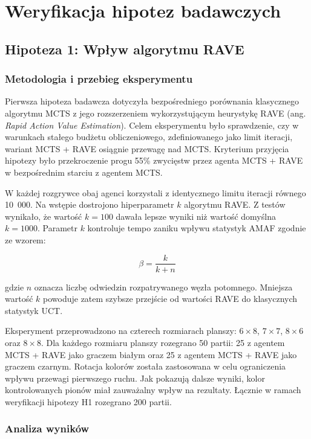 \documentclass{article}
\begin{document}
\newpage
\section{Weryfikacja hipotez badawczych}

\subsection{Hipoteza 1: Wpływ algorytmu RAVE}

\subsubsection{Metodologia i przebieg eksperymentu}

Pierwsza hipoteza badawcza dotyczyła bezpośredniego porównania klasycznego algorytmu MCTS z jego rozszerzeniem wykorzystującym heurystykę RAVE (ang. \textit{Rapid Action Value Estimation}). Celem eksperymentu było sprawdzenie, czy w warunkach stałego budżetu obliczeniowego, zdefiniowanego jako limit iteracji, wariant MCTS + RAVE osiągnie przewagę nad MCTS. Kryterium przyjęcia hipotezy było przekroczenie progu 55\% zwycięstw przez agenta MCTS + RAVE w bezpośrednim starciu z agentem MCTS.

W każdej rozgrywce obaj agenci korzystali z identycznego limitu iteracji równego 10~000. Na wstępie dostrojono hiperparametr $k$ algorytmu RAVE. Z testów wynikało, że wartość $k = 100$ dawała lepsze wyniki niż wartość domyślna $k = 1000$. Parametr $k$ kontroluje tempo zaniku wpływu statystyk AMAF zgodnie ze wzorem:

$$
\beta = \frac{k}{k + n}
$$

\noindent
gdzie $n$ oznacza liczbę odwiedzin rozpatrywanego węzła potomnego. Mniejsza wartość $k$ powoduje zatem szybsze przejście od wartości RAVE do klasycznych statystyk UCT.

Eksperyment przeprowadzono na czterech rozmiarach planszy: $6 \times 8$, $7 \times 7$, $8 \times 6$ oraz $8 \times 8$. Dla każdego rozmiaru planszy rozegrano 50 partii: 25 z agentem MCTS + RAVE jako graczem białym oraz 25 z agentem MCTS + RAVE jako graczem czarnym. Rotacja kolorów została zastosowana w celu ograniczenia wpływu przewagi pierwszego ruchu. Jak pokazują dalsze wyniki, kolor kontrolowanych pionów miał zauważalny wpływ na rezultaty. Łącznie w ramach weryfikacji hipotezy H1 rozegrano 200 partii.

\subsubsection{Analiza wyników}
\end{document}
